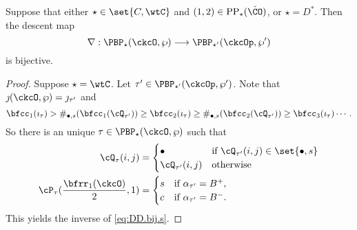 \documentclass[ssunip]{subfiles}
\begin{document}
\begin{prop}\label{lem:DD.bij}
Suppose that either $\star \in \set{C,\wtC}$ and $(1,2)\in \mathrm{PP}_\star(\check \CO)$, or $\star=D^*$. Then the descent map 
\begin{equation}\label{eq:DD.bij.s}
\nabla: \PBP_\star(\ckcO,\wp)\longrightarrow  \PBP_{\star'}(\ckcOp,\wp') 
\end{equation}
is bijective. 
\end{prop}
\def\nds{\#_{\bullet,s}}
\begin{proof}
Suppose $\star = \wtC$. Let $\tau'\in \PBP_{\star'}(\ckcOp,\wp')$.
Note that $\jmath(\ckcO,\wp) = \jmath_{\tau'}$ and 
\[
\bfcc_1(\imath_\tau) > %
\nds(\bfcc_1(\cQ_{\tau'})) \geq \bfcc_2(\imath_\tau)
\geq \nds(\bfcc_2(\cQ_{\tau'})) \geq \bfcc_3(\imath_\tau)\cdots.  
\]
So there is an unique $\tau\in \PBP_{\star}(\ckcO,\wp)$ 
such that 
\[
\begin{split}
\cQ_\tau(i,j) & = 
\begin{cases}
\bullet & \text{if } \cQ_{\tau'}(i,j) \in \set{\bullet,s}\\
\cQ_{\tau'}(i,j)  & \text{otherwise}
\end{cases} \\
\cP_\tau (\frac{\bfrr_1(\ckcO)}{2},1) & = \begin{cases}
s  & \text{if } \alpha_{\tau'} = B^+,\\
c  & \text{if } \alpha_{\tau'} = B^-.\\
\end{cases}
\end{split}
\]
This yields the inverse of \eqref{eq:DD.bij.s}.  


\end{proof}
\end{document}

